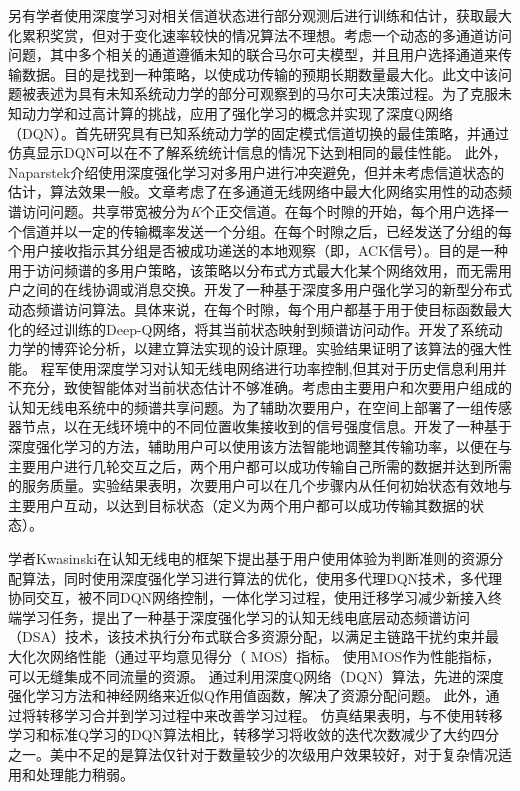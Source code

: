 另有学者使用深度学习对相关信道状态进行部分观测后进行训练和估计，获取最大化累积奖赏，但对于变化速率较快的情况算法不理想\cite{8303773}。考虑一个动态的多通道访问问题，其中多个相关的通道遵循未知的联合马尔可夫模型，并且用户选择通道来传输数据。目的是找到一种策略，以使成功传输的预期长期数量最大化。此文中该问题被表述为具有未知系统动力学的部分可观察到的马尔可夫决策过程。为了克服未知动力学和过高计算的挑战，应用了强化学习的概念并实现了深度Q网络（DQN）。首先研究具有已知系统动力学的固定模式信道切换的最佳策略，并通过仿真显示DQN可以在不了解系统统计信息的情况下达到相同的最佳性能。
此外，Naparstek介绍使用深度强化学习对多用户进行冲突避免，但并未考虑信道状态的估计，算法效果一般\cite{8254101}。文章考虑了在多通道无线网络中最大化网络实用性的动态频谱访问问题。共享带宽被分为\textit{K}个正交信道。在每个时隙的开始，每个用户选择一个信道并以一定的传输概率发送一个分组。在每个时隙之后，已经发送了分组的每个用户接收指示其分组是否被成功递送的本地观察（即，ACK信号）。目的是一种用于访问频谱的多用户策略，该策略以分布式方式最大化某个网络效用，而无需用户之间的在线协调或消息交换。开发了一种基于深度多用户强化学习的新型分布式动态频谱访问算法。具体来说，在每个时隙，每个用户都基于用于使目标函数最大化的经过训练的Deep-Q网络，将其当前状态映射到频谱访问动作。开发了系统动力学的博弈论分析，以建立算法实现的设计原理。实验结果证明了该算法的强大性能。
程军使用深度学习对认知无线电网络进行功率控制,但其对于历史信息利用并不充分，致使智能体对当前状态估计不够准确\cite{Li2018Intelligent}。考虑由主要用户和次要用户组成的认知无线电系统中的频谱共享问题。为了辅助次要用户，在空间上部署了一组传感器节点，以在无线环境中的不同位置收集接收到的信号强度信息。开发了一种基于深度强化学习的方法，辅助用户可以使用该方法智能地调整其传输功率，以便在与主要用户进行几轮交互之后，两个用户都可以成功传输自己所需的数据并达到所需的服务质量。实验结果表明，次要用户可以在几个步骤内从任何初始状态有效地与主要用户互动，以达到目标状态（定义为两个用户都可以成功传输其数据的状态）。

学者Kwasinski在认知无线电的框架下提出基于用户使用体验为判断准则的资源分配算法，同时使用深度强化学习进行算法的优化，使用多代理DQN技术，多代理协同交互，被不同DQN网络控制，一体化学习过程，使用迁移学习减少新接入终端学习任务，提出了一种基于深度强化学习的认知无线电底层动态频谱访问（DSA）技术，该技术执行分布式联合多资源分配，以满足主链路干扰约束并最大化次网络性能（通过平均意见得分（ MOS）指标。 使用MOS作为性能指标，可以无缝集成不同流量的资源。 通过利用深度Q网络（DQN）算法，先进的深度强化学习方法和神经网络来近似Q作用值函数，解决了资源分配问题。 此外，通过将转移学习合并到学习过程中来改善学习过程。 仿真结果表明，与不使用转移学习和标准Q学习的DQN算法相比，转移学习将收敛的迭代次数减少了大约四分之一。美中不足的是算法仅针对于数量较少的次级用户效果较好，对于复杂情况适用和处理能力稍弱\cite{8403658}。

